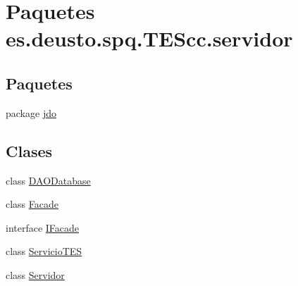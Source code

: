 \hypertarget{namespacees_1_1deusto_1_1spq_1_1_t_e_scc_1_1servidor}{\section{Paquetes es.\+deusto.\+spq.\+T\+E\+Scc.\+servidor}
\label{namespacees_1_1deusto_1_1spq_1_1_t_e_scc_1_1servidor}
}
\subsection*{Paquetes}
\begin{DoxyCompactItemize}
\item 
package \hyperlink{namespacees_1_1deusto_1_1spq_1_1_t_e_scc_1_1servidor_1_1jdo}{jdo}
\end{DoxyCompactItemize}
\subsection*{Clases}
\begin{DoxyCompactItemize}
\item 
class \hyperlink{classes_1_1deusto_1_1spq_1_1_t_e_scc_1_1servidor_1_1_d_a_o_database}{D\+A\+O\+Database}
\item 
class \hyperlink{classes_1_1deusto_1_1spq_1_1_t_e_scc_1_1servidor_1_1_facade}{Facade}
\item 
interface \hyperlink{interfacees_1_1deusto_1_1spq_1_1_t_e_scc_1_1servidor_1_1_i_facade}{I\+Facade}
\item 
class \hyperlink{classes_1_1deusto_1_1spq_1_1_t_e_scc_1_1servidor_1_1_servicio_t_e_s}{Servicio\+T\+E\+S}
\item 
class \hyperlink{classes_1_1deusto_1_1spq_1_1_t_e_scc_1_1servidor_1_1_servidor}{Servidor}
\end{DoxyCompactItemize}
